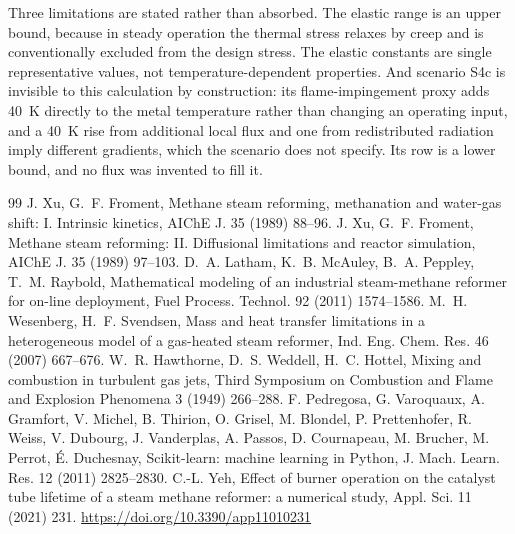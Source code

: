 \documentclass[final,3p,times]{elsarticle}
\begin{document}
Three limitations are stated rather than absorbed. The elastic range is an upper bound,
because in steady operation the thermal stress relaxes by creep and is conventionally
excluded from the design stress. The elastic constants are single representative values,
not temperature-dependent properties. And scenario S4c is invisible to this calculation by
construction: its flame-impingement proxy adds 40~K directly to the metal temperature
rather than changing an operating input, and a 40~K rise from additional local flux and one
from redistributed radiation imply different gradients, which the scenario does not
specify. Its row is a lower bound, and no flux was invented to fill it.

\begin{thebibliography}{99}
 J. Xu, G.~F. Froment, Methane steam reforming, methanation and water-gas shift: I. Intrinsic kinetics, AIChE J. 35 (1989) 88--96.
 J. Xu, G.~F. Froment, Methane steam reforming: II. Diffusional limitations and reactor simulation, AIChE J. 35 (1989) 97--103.
 D.~A. Latham, K.~B. McAuley, B.~A. Peppley, T.~M. Raybold, Mathematical modeling of an industrial steam-methane reformer for on-line deployment, Fuel Process. Technol. 92 (2011) 1574--1586.
 M.~H. Wesenberg, H.~F. Svendsen, Mass and heat transfer limitations in a heterogeneous model of a gas-heated steam reformer, Ind. Eng. Chem. Res. 46 (2007) 667--676.
 W.~R. Hawthorne, D.~S. Weddell, H.~C. Hottel, Mixing and combustion in turbulent gas jets, Third Symposium on Combustion and Flame and Explosion Phenomena 3 (1949) 266--288.
 F. Pedregosa, G. Varoquaux, A. Gramfort, V. Michel, B. Thirion, O. Grisel, M. Blondel, P. Prettenhofer, R. Weiss, V. Dubourg, J. Vanderplas, A. Passos, D. Cournapeau, M. Brucher, M. Perrot, \'E. Duchesnay, Scikit-learn: machine learning in Python, J. Mach. Learn. Res. 12 (2011) 2825--2830.
 C.-L. Yeh, Effect of burner operation on the catalyst tube lifetime of a steam methane reformer: a numerical study, Appl. Sci. 11 (2021) 231. \url{https://doi.org/10.3390/app11010231}

\end{thebibliography}
\end{document}
